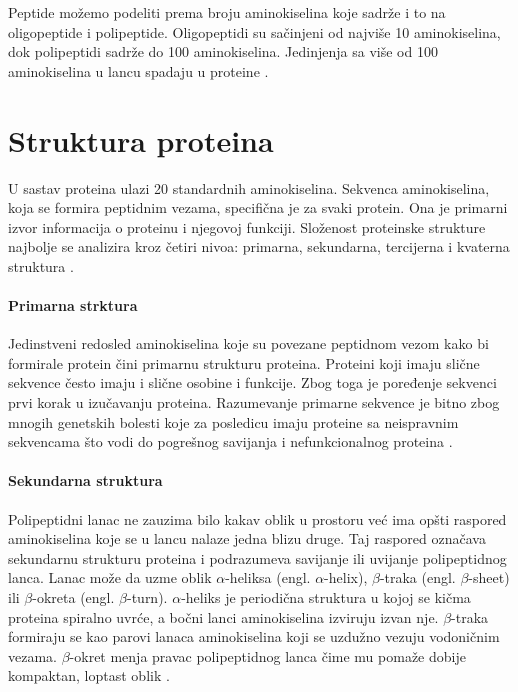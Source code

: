 Peptide možemo podeliti prema broju aminokiselina koje sadrže i to na oligopeptide i polipeptide. Oligopeptidi su sačinjeni od najviše 10 aminokiselina, dok polipeptidi sadrže do 100 aminokiselina. Jedinjenja sa više od 100 aminokiselina u lancu spadaju u proteine \cite{biohUdz}.



\section{Struktura proteina}

U sastav proteina ulazi 20 standardnih aminokiselina. Sekvenca aminokiselina, koja se formira peptidnim vezama, specifična je za svaki protein. Ona je primarni izvor informacija o proteinu i njegovoj funkciji. Složenost proteinske strukture najbolje se analizira kroz četiri nivoa: primarna, sekundarna, tercijerna i kvaterna struktura \cite{biochemestry5}.

\paragraph{Primarna strktura} Jedinstveni redosled aminokiselina koje su povezane peptidnom vezom kako bi formirale protein čini primarnu strukturu proteina. Proteini koji imaju slične sekvence često imaju i slične osobine i funkcije. Zbog toga je poređenje sekvenci prvi korak u izučavanju proteina. Razumevanje primarne sekvence je bitno zbog mnogih genetskih bolesti koje za posledicu imaju proteine sa neispravnim sekvencama što vodi do pogrešnog savijanja i nefunkcionalnog proteina \cite{biochemestry5, biohUdz, bioinf}.

\paragraph{Sekundarna struktura} Polipeptidni lanac ne zauzima bilo kakav oblik u prostoru već ima opšti raspored aminokiselina koje se u lancu nalaze jedna blizu druge. Taj raspored označava sekundarnu strukturu proteina i podrazumeva savijanje ili uvijanje polipeptidnog lanca. Lanac može da uzme oblik $\alpha$-heliksa (engl. $\alpha$-helix), $\beta$-traka (engl. $\beta$-sheet) ili $\beta$-okreta (engl. $\beta$-turn). $\alpha$-heliks je periodična struktura u kojoj se kičma proteina spiralno uvrće, a bočni lanci aminokiselina izviruju izvan nje. $\beta$-traka formiraju se kao parovi lanaca aminokiselina koji se uzdužno vezuju vodoničnim vezama. $\beta$-okret menja pravac polipeptidnog lanca čime mu pomaže dobije kompaktan, loptast oblik \cite{biochemestry5, bioinf, PSF}.

